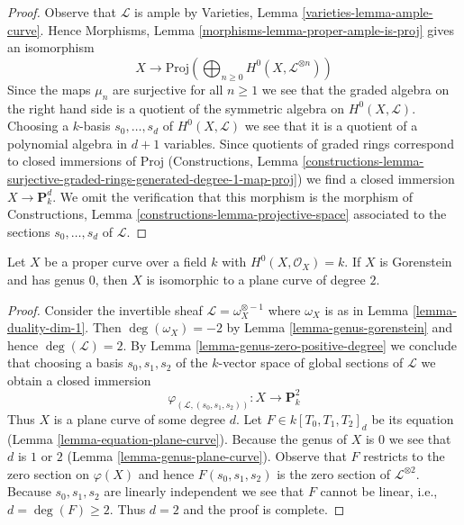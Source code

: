 \begin{proof}
\medskip\noindent
Observe that $\mathcal{L}$ is ample by
Varieties, Lemma \ref{varieties-lemma-ample-curve}.
Hence
Morphisms, Lemma \ref{morphisms-lemma-proper-ample-is-proj}
gives an isomorphism
$$
X \longrightarrow
\text{Proj}\left(
\bigoplus\nolimits_{n \geq 0} H^0(X, \mathcal{L}^{\otimes n})\right)
$$
Since the maps $\mu_n$ are surjective for all $n \geq 1$ we see that
the graded algebra on the right hand side is a quotient of
the symmetric algebra on $H^0(X, \mathcal{L})$. Choosing a $k$-basis
$s_0, \ldots, s_d$ of $H^0(X, \mathcal{L})$ we see that
it is a quotient of a polynomial algebra in $d + 1$ variables.
Since quotients of graded rings correspond to closed immersions
of $\text{Proj}$ (Constructions, Lemma
\ref{constructions-lemma-surjective-graded-rings-generated-degree-1-map-proj})
we find a closed immersion $X \to \mathbf{P}^d_k$. We omit the
verification that this morphism is the morphism of
Constructions, Lemma \ref{constructions-lemma-projective-space}
associated to the sections $s_0, \ldots, s_d$ of $\mathcal{L}$.
\end{proof}

\begin{lemma}
\label{lemma-genus-zero}
Let $X$ be a proper curve over a field $k$ with $H^0(X, \mathcal{O}_X) = k$.
If $X$ is Gorenstein and has genus $0$, then $X$
is isomorphic to a plane curve of degree $2$.
\end{lemma}

\begin{proof}
Consider the invertible sheaf $\mathcal{L} = \omega_X^{\otimes -1}$ where
$\omega_X$ is as in Lemma \ref{lemma-duality-dim-1}. Then
$\deg(\omega_X) = -2$ by Lemma \ref{lemma-genus-gorenstein}
and hence $\deg(\mathcal{L}) = 2$. By
Lemma \ref{lemma-genus-zero-positive-degree}
we conclude that choosing a basis $s_0, s_1, s_2$ of the $k$-vector
space of global sections of $\mathcal{L}$ we obtain a closed immersion
$$
\varphi_{(\mathcal{L}, (s_0, s_1, s_2))} :
X \longrightarrow \mathbf{P}^2_k
$$
Thus $X$ is a plane curve of some degree $d$. Let $F \in k[T_0, T_1, T_2]_d$
be its equation (Lemma \ref{lemma-equation-plane-curve}).
Because the genus of $X$ is $0$ we see that $d$ is $1$ or $2$
(Lemma \ref{lemma-genus-plane-curve}). Observe that
$F$ restricts to the zero section on $\varphi(X)$ and hence
$F(s_0, s_1, s_2)$ is the zero section of $\mathcal{L}^{\otimes 2}$.
Because $s_0, s_1, s_2$ are linearly independent we see that $F$
cannot be linear, i.e., $d = \deg(F) \geq 2$. Thus $d = 2$
and the proof is complete.
\end{proof}

